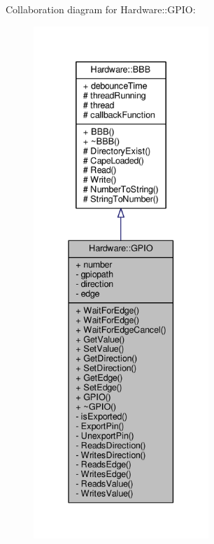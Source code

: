Collaboration diagram for Hardware\+:\+:G\+P\+I\+O\+:\nopagebreak
\begin{figure}[H]
\begin{center}
\leavevmode
\includegraphics[height=550pt]{class_hardware_1_1_g_p_i_o__coll__graph}
\end{center}
\end{figure}
